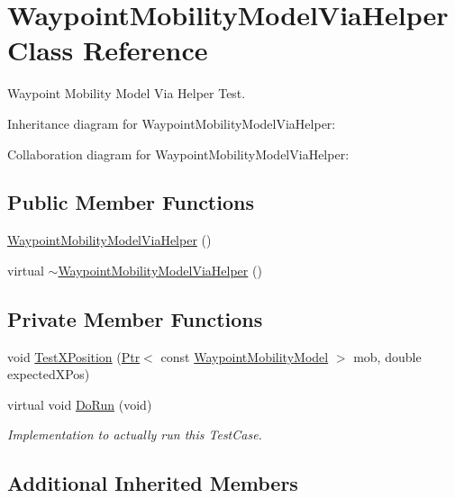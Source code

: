 \hypertarget{classWaypointMobilityModelViaHelper}{}\section{Waypoint\+Mobility\+Model\+Via\+Helper Class Reference}
\label{classWaypointMobilityModelViaHelper}


Waypoint Mobility Model Via Helper Test.  




Inheritance diagram for Waypoint\+Mobility\+Model\+Via\+Helper\+:


Collaboration diagram for Waypoint\+Mobility\+Model\+Via\+Helper\+:
\subsection*{Public Member Functions}
\begin{DoxyCompactItemize}
\item 
\hyperlink{classWaypointMobilityModelViaHelper_a0a34840232900dafe5ba349895d8cc04}{Waypoint\+Mobility\+Model\+Via\+Helper} ()
\item 
virtual \hyperlink{classWaypointMobilityModelViaHelper_aef6a269015c830cc42aa315f6c8885dc}{$\sim$\+Waypoint\+Mobility\+Model\+Via\+Helper} ()
\end{DoxyCompactItemize}
\subsection*{Private Member Functions}
\begin{DoxyCompactItemize}
\item 
void \hyperlink{classWaypointMobilityModelViaHelper_a89eb4e29a9b5de6d20b3fb24605080a5}{Test\+X\+Position} (\hyperlink{classns3_1_1Ptr}{Ptr}$<$ const \hyperlink{classns3_1_1WaypointMobilityModel}{Waypoint\+Mobility\+Model} $>$ mob, double expected\+X\+Pos)
\item 
virtual void \hyperlink{classWaypointMobilityModelViaHelper_a7ba11c2c935294e6a211f13d70905ac7}{Do\+Run} (void)
\begin{DoxyCompactList}\small\item\em Implementation to actually run this Test\+Case. \end{DoxyCompactList}\end{DoxyCompactItemize}
\subsection*{Additional Inherited Members}


